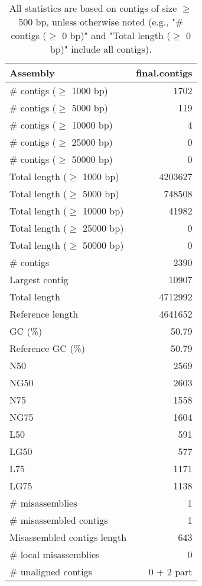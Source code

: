 \documentclass[12pt,a4paper]{article}
\begin{document}
\begin{table}[ht]
\begin{center}
\caption{All statistics are based on contigs of size $\geq$ 500 bp, unless otherwise noted (e.g., "\# contigs ($\geq$ 0 bp)" and "Total length ($\geq$ 0 bp)" include all contigs).}
\begin{tabular}{|l*{1}{|r}|}
\hline
Assembly & final.contigs \\ \hline
\# contigs ($\geq$ 1000 bp) & 1702 \\ \hline
\# contigs ($\geq$ 5000 bp) & 119 \\ \hline
\# contigs ($\geq$ 10000 bp) & 4 \\ \hline
\# contigs ($\geq$ 25000 bp) & 0 \\ \hline
\# contigs ($\geq$ 50000 bp) & 0 \\ \hline
Total length ($\geq$ 1000 bp) & 4203627 \\ \hline
Total length ($\geq$ 5000 bp) & 748508 \\ \hline
Total length ($\geq$ 10000 bp) & 41982 \\ \hline
Total length ($\geq$ 25000 bp) & 0 \\ \hline
Total length ($\geq$ 50000 bp) & 0 \\ \hline
\# contigs & 2390 \\ \hline
Largest contig & 10907 \\ \hline
Total length & 4712992 \\ \hline
Reference length & 4641652 \\ \hline
GC (\%) & 50.79 \\ \hline
Reference GC (\%) & 50.79 \\ \hline
N50 & 2569 \\ \hline
NG50 & 2603 \\ \hline
N75 & 1558 \\ \hline
NG75 & 1604 \\ \hline
L50 & 591 \\ \hline
LG50 & 577 \\ \hline
L75 & 1171 \\ \hline
LG75 & 1138 \\ \hline
\# misassemblies & 1 \\ \hline
\# misassembled contigs & 1 \\ \hline
Misassembled contigs length & 643 \\ \hline
\# local misassemblies & 0 \\ \hline
\# unaligned contigs & 0 + 2 part \\ \hline

\end{tabular}
\end{center}
\end{table}
\end{document}
